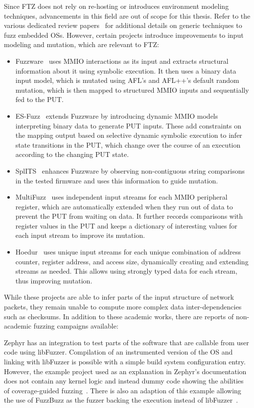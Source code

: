 \documentclass[twocolumn]{article}
\newcommand{\proj}{FTZ\xspace}
\let\savedCite=\cite
\renewcommand{\cite}{\unskip~\savedCite}
\begin{document}
Since \proj does not rely on re-hosting or introduces environment modeling techniques, advancements in this field are out of scope for this thesis. Refer to the various dedicated review papers\cite{EmbeddedReview,IoTSurvey,ChallengesReHosting,SoK} for additional details on generic techniques to fuzz embedded OSs. However, certain projects introduce improvements to input modeling and mutation, which are relevant to \proj :
\begin{itemize}
  \item Fuzzware\cite{Fuzzware} uses MMIO interactions as its input and extracts structural information about it using symbolic execution. It then uses a binary data input model, which is mutated using AFL's and AFL++'s default random mutation, which is then mapped to structured MMIO inputs and sequentially fed to the PUT.
  \item ES-Fuzz\cite{ESFuzz} extends Fuzzware by introducing dynamic MMIO models interpreting binary data to generate PUT inputs. These add constraints on the mapping output based on selective dynamic symbolic execution to infer state transitions in the PUT, which change over the course of an execution according to the changing PUT state.
  \item SplITS\cite{SplITS} enhances Fuzzware by observing non-contiguous string comparisons in the tested firmware and uses this information to guide mutation.
  \item MultiFuzz\cite{MultiFuzz} uses independent input streams for each MMIO peripheral register, which are automatically extended when they run out of data to prevent the PUT from waiting on data. It further records comparisons with register values in the PUT and keeps a dictionary of interesting values for each input stream to improve its mutation.
  \item Hoedur\cite{Hoedur} uses unique input streams for each unique combination of address counter, register address, and access size, dynamically creating and extending streams as needed. This allows using strongly typed data for each stream, thus improving mutation.
\end{itemize}

While these projects are able to infer parts of the input structure of network packets, they remain unable to compute more complex data inter-dependencies such as checksums. In addition to these academic works, there are reports of non-academic fuzzing campaigns available:

Zephyr has an integration to test parts of the software that are callable from user code using libFuzzer. Compilation of an instrumented version of the OS and linking with libFuzzer is possible with a simple build system configuration entry. However, the example project used as an explanation in Zephyr's documentation does not contain any kernel logic and instead dummy code showing the abilities of coverage-guided fuzzing\cite{ZephyrFuzzing, ZephyrFuzzingSample}. There is also an adaption of this example allowing the use of FuzzBuzz as the fuzzer backing the execution instead of libFuzzer\cite{ZephyrFuzzBuzz}.
\end{document}
